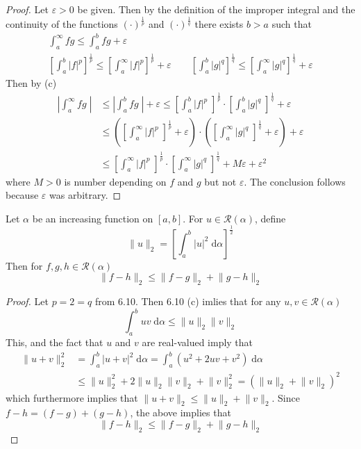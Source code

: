 \documentclass{homework}
\begin{document}
\begin{alphaparts}
		\begin{proof}
			Let $\varepsilon > 0$ be given. Then by the definition of the improper integral and the continuity of the functions $(\cdot)^\frac{1}{p}$ and $(\cdot)^\frac{1}{q}$ there exists $b > a$ such that
			$$
			\begin{gathered}
				\int_a^\infty fg \le \int_a^b fg + \varepsilon\\ \left[\int_a^b|f|^p\right]^\frac{1}{p}\le \left[\int_a^\infty|f|^p\right]^\frac{1}{p} + \varepsilon \qquad \left[\int_a^b|g|^q\right]^\frac{1}{q} \le \left[\int_a^\infty|g|^q\right]^\frac{1}{q} + \varepsilon
			\end{gathered}
			$$
			Then by (c)
			$$
			\begin{aligned}
				\left|\int_a^\infty fg\;\right| &\le \left|\int_a^b fg\;\right| + \varepsilon \le \left[\int_a^b|f|^p\;\right]^\frac{1}{p}\cdot\left[\int_a^b |g|^q\;\right]^\frac{1}{q} + \varepsilon\\
				&\le \left(\left[\int_a^\infty|f|^p\;\right]^\frac{1}{p}+\varepsilon\right)\cdot\left(\left[\int_a^\infty |g|^q\;\right]^\frac{1}{q}+\varepsilon\right) + \varepsilon\\
				&\le \left[\int_a^\infty|f|^p\;\right]^\frac{1}{p}\cdot\left[\int_a^\infty |g|^q\;\right]^\frac{1}{q} + M\varepsilon + \varepsilon^2
			\end{aligned}
			$$
			where $M > 0$ is number depending on $f$ and $g$ but not $\varepsilon$. The conclusion follows because $\varepsilon$ was arbitrary.
		\end{proof}
	\end{alphaparts}
	
	
	Let $\alpha$ be an increasing function on $[a,b]$. For $u \in \mathscr{R}(\alpha)$, define
	$$
	\lVert u\rVert_2 = \left[\int_a^b |u|^2\;\text{d}\alpha\right]^{\frac{1}{2}}
	$$
	Then for $f, g, h \in \mathscr{R}(\alpha)$
	$$
	\lVert f - h\rVert_2 \le \lVert f -g \rVert_2 + \lVert g - h\rVert_2
	$$
	\begin{proof}
		Let $p = 2 = q$ from 6.10. Then 6.10 (c) imlies that for any $u,v \in \mathscr{R}(\alpha)$
		$$
		\int_a^b uv \;\text{d}\alpha \le \lVert u \rVert_2\lVert v\rVert_2
		$$
		This, and the fact that $u$ and $v$ are real-valued imply that
		$$
		\begin{aligned}
			\lVert u + v \rVert_2^2 &= \int_a^b|u + v|^2\;\text{d}\alpha = \int_a^b (u^2 + 2uv + v^2)\;\text{d}\alpha\\
			&\le \lVert u\rVert_2^2 + 2 \lVert u\rVert_2\lVert v\rVert_2 + \lVert v\rVert_2^2 = (\lVert u\rVert_2 + \lVert v \rVert_2)^2
		\end{aligned}
		$$
		which furthermore implies that $\lVert u + v \rVert_2 \le \lVert u \rVert_2 + \lVert v \rVert_2$. Since $f- h = (f-g) + (g-h)$, the above implies that
		$$
		\lVert f - h\rVert_2 \le \lVert f -g \rVert_2 + \lVert g - h\rVert_2
		$$
	\end{proof}
	
\end{document}

